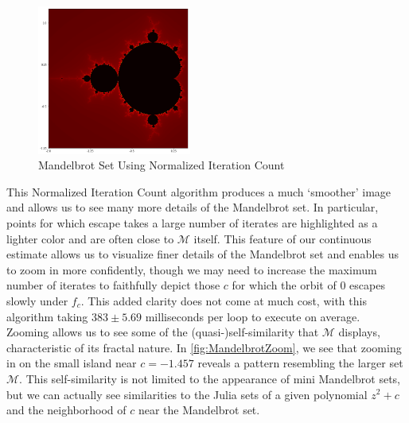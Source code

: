 \documentclass{amsart}
\newcommand{\cal}[1]{ \mathcal{#1}}
\newcommand{\Mand}{\cal{M}}
\theoremstyle{definition}
\theoremstyle{remark}
\numberwithin{equation}{section}
\begin{document}
\inputminted[mathescape]{python}{code-snippets/Mandelbrot_c.py}

\begin{figure}[h]
  \centering
  \includegraphics[width=0.45\textwidth]{Mandelbrot_c_5000.png}
  \caption{Mandelbrot Set Using Normalized Iteration Count}
\end{figure}

This Normalized Iteration Count algorithm produces a much `smoother' image and allows us to see many more details of the Mandelbrot set. In particular, points for which escape takes a large number of iterates are highlighted as a lighter color and are often close to $\Mand$ itself. This feature of our continuous estimate allows us to visualize finer details of the Mandelbrot set and enables us to zoom in more confidently, though we may need to increase the maximum number of iterates to faithfully depict those $c$ for which the orbit of 0 escapes slowly under $f_c$. This added clarity does not come at much cost, with this algorithm taking $383 \pm 5.69$ milliseconds per loop to execute on average.\\

Zooming allows us to see some of the (quasi-)self-similarity that $\Mand$ displays, characteristic of its fractal nature. In \cref{fig:MandelbrotZoom}, we see that zooming in on the small island near $c=-1.457$ reveals a pattern resembling the larger set $\Mand$. This self-similarity is not limited to the appearance of mini Mandelbrot sets, but we can actually see similarities to the Julia sets of a given polynomial $z^2+c$ and the neighborhood of $c$ near the Mandelbrot set.\\
\end{document}
